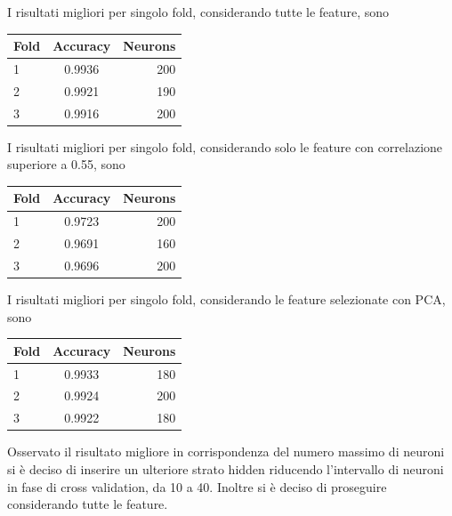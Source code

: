 \documentclass[12pt]{report}
\begin{document}
I risultati migliori per singolo fold, considerando tutte le feature, sono
\begin{center}
\begin{tabular}{lcr}
\toprule
Fold & Accuracy & Neurons \\
\midrule
1  & 0.9936 & 200\\
2  & 0.9921 & 190\\
3  & 0.9916 & 200\\
\bottomrule
\end{tabular}
\end{center}

\par\null\par
\par\null\par

I risultati migliori per singolo fold, considerando solo le feature con correlazione superiore a 0.55, sono

\begin{center}
\begin{tabular}{lcr}
\toprule
Fold & Accuracy & Neurons \\
\midrule
1  & 0.9723 & 200\\
2  & 0.9691 & 160\\
3  & 0.9696 & 200\\
\bottomrule
\end{tabular}
\end{center}

\par\null\par
\par\null\par

I risultati migliori per singolo fold, considerando le feature selezionate con PCA, sono

\begin{center}
\begin{tabular}{lcr}
\toprule
Fold & Accuracy & Neurons \\
\midrule
1  & 0.9933 & 180\\
2  & 0.9924 & 200\\
3  & 0.9922 & 180\\
\bottomrule
\end{tabular}
\end{center}

\par\null\par

Osservato il risultato migliore in corrispondenza del numero massimo di neuroni si è deciso di inserire un ulteriore strato hidden riducendo l'intervallo di neuroni in fase di cross validation, da 10 a 40.
Inoltre si è deciso di proseguire considerando tutte le feature.
\end{document}

